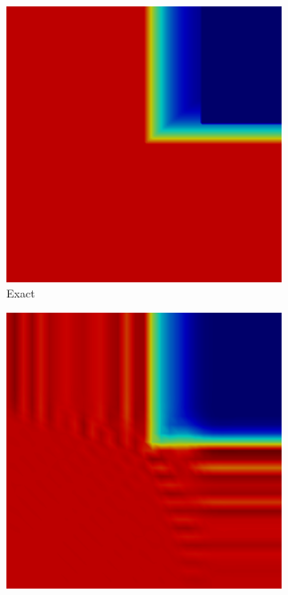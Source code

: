 \begin{figure}[h]
   \centering
   \begin{subfigure}{0.3\textwidth}
      \includegraphics[width=\textwidth]{skew_void_to_absorber/exact.png}
      \caption{Exact}
   \end{subfigure}
   \begin{subfigure}{0.3\textwidth}
      \includegraphics[width=\textwidth]{skew_void_to_absorber/Gal.png}

\end{subfigure}
\end{figure}
